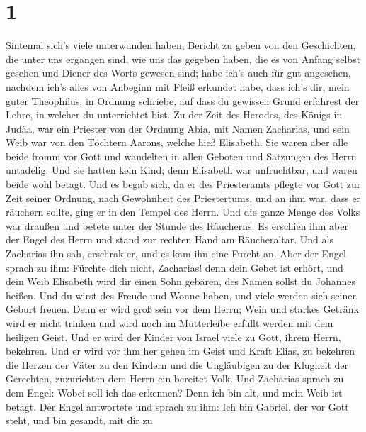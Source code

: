 \hypertarget{section}{%
\section{1}\label{section}}

 Sintemal sich's viele unterwunden haben, Bericht zu geben
von den Geschichten, die unter uns ergangen sind,  wie uns
das gegeben haben, die es von Anfang selbst gesehen und Diener des Worts
gewesen sind;  habe ich's auch für gut angesehen, nachdem
ich's alles von Anbeginn mit Fleiß erkundet habe, dass ich's dir, mein
guter Theophilus, in Ordnung schriebe,  auf dass du gewissen
Grund erfahrest der Lehre, in welcher du unterrichtet bist. 
Zu der Zeit des Herodes, des Königs in Judäa, war ein Priester von der
Ordnung Abia, mit Namen Zacharias, und sein Weib war von den Töchtern
Aarons, welche hieß Elisabeth.  Sie waren aber alle beide
fromm vor Gott und wandelten in allen Geboten und Satzungen des Herrn
untadelig.  Und sie hatten kein Kind; denn Elisabeth war
unfruchtbar, und waren beide wohl betagt.  Und es begab
sich, da er des Priesteramts pflegte vor Gott zur Zeit seiner Ordnung,
 nach Gewohnheit des Priestertums, und an ihm war, dass er
räuchern sollte, ging er in den Tempel des Herrn.  Und die
ganze Menge des Volks war draußen und betete unter der Stunde des
Räucherns.  Es erschien ihm aber der Engel des Herrn und
stand zur rechten Hand am Räucheraltar.  Und als Zacharias
ihn sah, erschrak er, und es kam ihn eine Furcht an.  Aber
der Engel sprach zu ihm: Fürchte dich nicht, Zacharias! denn dein Gebet
ist erhört, und dein Weib Elisabeth wird dir einen Sohn gebären, des
Namen sollst du Johannes heißen.  Und du wirst des Freude
und Wonne haben, und viele werden sich seiner Geburt freuen.
 Denn er wird groß sein vor dem Herrn; Wein und starkes
Getränk wird er nicht trinken und wird noch im Mutterleibe erfüllt
werden mit dem heiligen Geist.  Und er wird der Kinder von
Israel viele zu Gott, ihrem Herrn, bekehren.  Und er wird
vor ihm her gehen im Geist und Kraft Elias, zu bekehren die Herzen der
Väter zu den Kindern und die Ungläubigen zu der Klugheit der Gerechten,
zuzurichten dem Herrn ein bereitet Volk.  Und Zacharias
sprach zu dem Engel: Wobei soll ich das erkennen? Denn ich bin alt, und
mein Weib ist betagt.  Der Engel antwortete und sprach zu
ihm: Ich bin Gabriel, der vor Gott steht, und bin gesandt, mit dir zu
